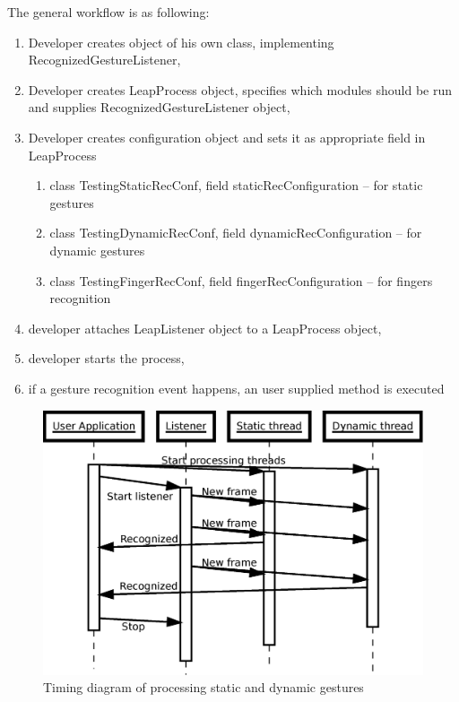 The general workflow is as following:
\begin{enumerate}
  \item Developer creates object of his own class, implementing RecognizedGestureListener,
  \item Developer creates LeapProcess object, specifies which modules should be run and supplies RecognizedGestureListener object,
  \item Developer creates configuration object and sets it as appropriate field in LeapProcess
  \begin{enumerate}
  	\item class TestingStaticRecConf, field staticRecConfiguration -- for static gestures
  	\item class TestingDynamicRecConf, field dynamicRecConfiguration -- for dynamic gestures
  	\item class TestingFingerRecConf, field fingerRecConfiguration -- for fingers recognition
  \end{enumerate}
  \item developer attaches LeapListener object to a LeapProcess object,
  \item developer starts the process,
  \item if a gesture recognition event happens, an user supplied method is executed
\end{enumerate}

\begin{figure}[htb]
\centering
 \includegraphics[width=0.8\columnwidth]{figures/timeline.eps}
 \caption[]{Timing diagram of processing static and dynamic gestures}
 \label{processingtimeline}
\end{figure}


